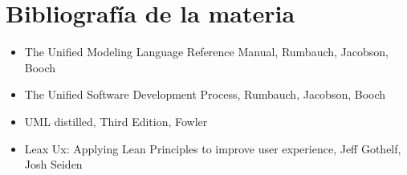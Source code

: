 \documentclass[titlepage,a4paper]{article}
\begin{document}
\newpage

\section{Bibliografía de la materia}
\begin{itemize}
    \item The Unified Modeling Language Reference Manual, Rumbauch, Jacobson, Booch
    \item The Unified Software Development Process, Rumbauch, Jacobson, Booch
    \item UML distilled, Third Edition, Fowler
    \item Leax Ux: Applying Lean Principles to improve user experience, Jeff Gothelf, Josh Seiden
\end{itemize}
\end{document}
